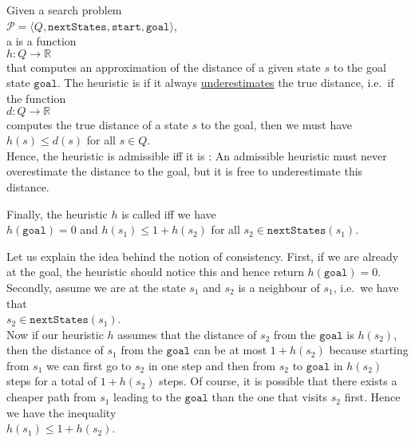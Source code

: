 \begin{Definition}[Heuristic]
Given a search problem
\\[0.2cm]
\hspace*{1.3cm}
$\mathcal{P} = \langle Q, \mathtt{nextStates}, \mathtt{start}, \mathtt{goal} \rangle$,
\\[0.2cm]
a  is a function
\\[0.2cm]
\hspace*{1.3cm}
$h: Q \rightarrow \mathbb{R}$
\\[0.2cm]
that computes an approximation of the distance of a given state $s$ to the goal state $\mathtt{goal}$.
The heuristic is  if it always \underline{underestimates} the true distance, i.e.~if the function
\\[0.2cm]
\hspace*{1.3cm}
$d:Q \rightarrow \mathbb{R}$
\\[0.2cm]
computes the true distance of a state $s$ to the goal, then we must have
\\[0.2cm]
\hspace*{1.3cm}
$h(s) \leq d(s)$ \quad for all $s \in Q$.
\\[0.2cm]
Hence, the heuristic is admissible iff it is :  An admissible heuristic must never overestimate the
distance to the goal, but it is free to underestimate this distance.

Finally, the  heuristic $h$ is called  iff we have
\\[0.2cm]
\hspace*{1.3cm}
$h(\mathtt{goal}) = 0$ \quad and \quad $h(s_1) \leq 1 + h(s_2)$ \quad for all $s_2 \in \mathtt{nextStates}(s_1)$.  \eod
\end{Definition}

Let us explain the idea behind the notion of consistency.  First, if we are already at the goal, the heuristic
should notice this and hence return $h(\mathtt{goal}) = 0$.  Secondly, assume we are at the state $s_1$ and $s_2$ is a
neighbour of $s_1$, i.e.~we have that 
\\[0.2cm]
\hspace*{1.3cm}
$s_2 \in \mathtt{nextStates}(s_1)$.
\\[0.2cm]
Now if our heuristic $h$ assumes that the distance of $s_2$ from the $\mathtt{goal}$ is $h(s_2)$, then the distance of
$s_1$ from the $\mathtt{goal}$ can be at most $1 + h(s_2)$ because starting from $s_1$ we can first go to $s_2$
in one step and then from $s_2$ to $\mathtt{goal}$ in $h(s_2)$ steps for a total of $1 + h(s_2)$ steps.  Of
course, it is possible that there exists a cheaper path from $s_1$ leading to the $\mathtt{goal}$ than the one
that visits $s_2$ first.  Hence we have the inequality 
\\[0.2cm]
\hspace*{1.3cm}
$h(s_1) \leq 1 + h(s_2)$.

